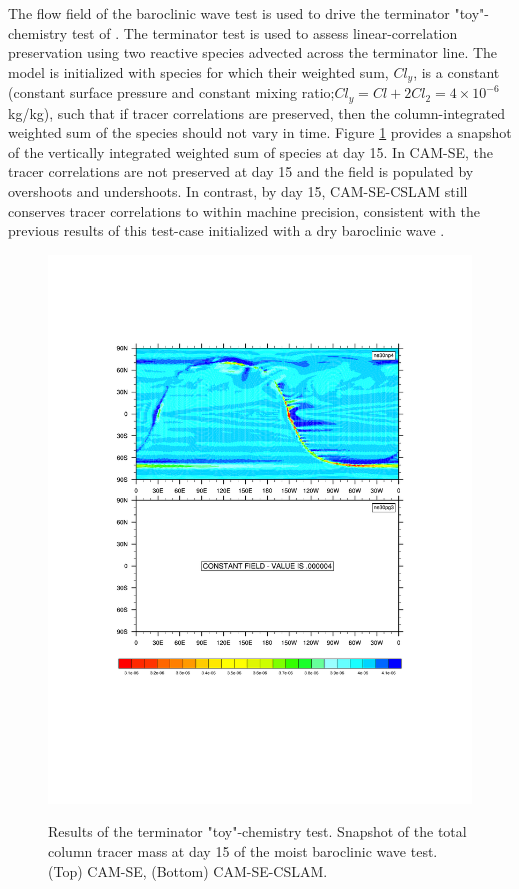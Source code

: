 \documentclass[twocol]{ametsoc}
\begin{document}
{\color{red}The flow field of the baroclinic wave test is used to drive the terminator "toy"-chemistry test of \cite{LCLVT2015GMD,LTOUNGK2017MWR}. The terminator test is used to assess linear-correlation preservation using two reactive species advected across the terminator line. The model is initialized with species for which their weighted sum, $Cl_y$, is a constant (constant surface pressure and constant mixing ratio;$Cl_y = Cl + 2Cl_2 = 4\times 10^{-6}$ kg/kg), such that if tracer correlations are preserved, then the column-integrated weighted sum of the species should not vary in time. Figure \ref{fig:term} provides a snapshot of the vertically integrated weighted sum of species at day 15. In CAM-SE, the tracer correlations are not preserved at day 15 and the field is populated by overshoots and undershoots. In contrast, by day 15, CAM-SE-CSLAM still conserves tracer correlations to within machine precision, consistent with the previous results of this test-case initialized with a dry baroclinic wave \citep{LTOUNGK2017MWR}.} 

\begin{figure}[t]
\begin{center}
\noindent\includegraphics[width=37pc,angle=0]{figs/terminator_iCLy.pdf}\\
\end{center}
\caption{Results of the terminator "toy"-chemistry test. Snapshot of the total column tracer mass at day 15 of the moist baroclinic wave test. (Top) CAM-SE, (Bottom) CAM-SE-CSLAM.}
\label{fig:term}
\end{figure}
\end{document}
